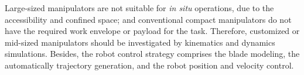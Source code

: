 Large-sized manipulators are not suitable for \textit{in situ} operations, due
to the accessibility and confined space; and conventional compact manipulators
do not have the required work envelope or payload for the task. Therefore,
customized or mid-sized manipulators should be investigated by kinematics and
dynamics simulations. Besides, the robot control strategy comprises the
blade modeling, the automatically trajectory generation,
and the robot position and velocity control.


